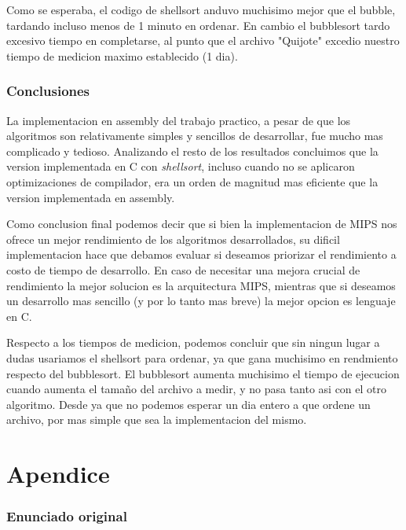\documentclass[a4paper,11pt]{article}
\begin{document}
\FloatBarrier

  Como se esperaba, el codigo de shellsort anduvo muchisimo mejor que el bubble,
  tardando incluso menos de 1 minuto en ordenar. En cambio el bubblesort tardo
  excesivo tiempo en completarse, al punto que el archivo "Quijote" excedio
  nuestro tiempo de medicion maximo establecido (1 dia).

\section{Conclusiones}

  La implementacion en assembly del trabajo practico, a pesar de que los
  algoritmos son relativamente simples y sencillos de desarrollar, fue
  mucho mas complicado y tedioso.
  Analizando el resto de los resultados concluimos que la version implementada en
  C con \textit{shellsort}, incluso cuando no se aplicaron optimizaciones de
  compilador, era un orden de magnitud mas eficiente que la version implementada
  en assembly.

  Como conclusion final podemos decir que si bien la implementacion de MIPS nos
  ofrece un mejor rendimiento de los algoritmos desarrollados, su dificil
  implementacion hace que debamos evaluar si deseamos priorizar el rendimiento
  a costo de tiempo de desarrollo. En caso de necesitar una mejora crucial de
  rendimiento la mejor solucion es la arquitectura MIPS, mientras que si deseamos
  un desarrollo mas sencillo (y por lo tanto mas breve) la mejor opcion es
  lenguaje en C.

  Respecto a los tiempos de medicion, podemos concluir que sin ningun lugar a
  dudas usariamos el shellsort para ordenar, ya que gana muchisimo en rendmiento
  respecto del bubblesort. El bubblesort aumenta muchisimo el tiempo de ejecucion
  cuando aumenta el tamaño del archivo a medir, y no pasa tanto asi con el otro
  algoritmo. Desde ya que no podemos esperar un dia entero a que ordene un archivo,
  por mas simple que sea la implementacion del mismo.

\clearpage

\part{Apendice}
\appendix

\section{Enunciado original}\label{sec:enunciado}

\end{document}
